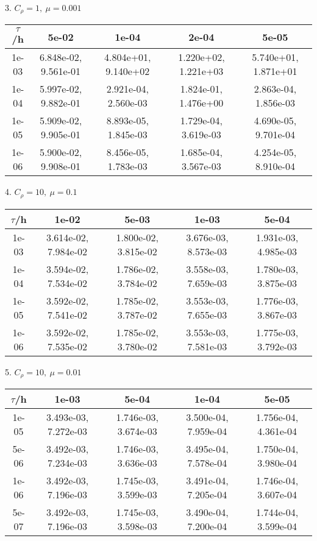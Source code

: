 3. $C_{\rho} = 1, \ \mu = 0.001$
\begin{center}
	\begin{tabular}{|c|c|c|c|c|} 
		\hline
		$\tau$/h & 5e-02 & 1e-04 & 2e-04 & 5e-05 \\ 
		\hline
		1e-03 & 6.848e-02,  9.561e-01 & 4.804e+01,  9.140e+02 & 1.220e+02,  1.221e+03 & 5.740e+01,  1.871e+01\\ 
		\hline
		1e-04 & 5.997e-02,  9.882e-01 & 2.921e-04,  2.560e-03 & 1.824e-01,  1.476e+00 & 2.863e-04,  1.856e-03\\ 
		\hline
		1e-05 & 5.909e-02,  9.905e-01 & 8.893e-05,  1.845e-03 & 1.729e-04,  3.619e-03 & 4.690e-05,  9.701e-04\\ 
		\hline
		1e-06 & 5.900e-02,  9.908e-01 & 8.456e-05,  1.783e-03 & 1.685e-04,  3.567e-03 & 4.254e-05,  8.910e-04\\ 
		\hline
	\end{tabular}
\end{center}

4. $C_{\rho} = 10, \ \mu = 0.1$
\begin{center}
	\begin{tabular}{|c|c|c|c|c|} 
		\hline
		$\tau$/h & 1e-02 & 5e-03 & 1e-03 & 5e-04 \\ 
		\hline
		1e-03 & 3.614e-02,  7.984e-02 & 1.800e-02,  3.815e-02 & 3.676e-03,  8.573e-03 & 1.931e-03,  4.985e-03\\ 
		\hline
		1e-04 & 3.594e-02,  7.534e-02 & 1.786e-02,  3.784e-02 & 3.558e-03,  7.659e-03 & 1.780e-03,  3.875e-03\\ 
		\hline
		1e-05 & 3.592e-02,  7.541e-02 & 1.785e-02,  3.787e-02 & 3.553e-03,  7.655e-03 & 1.776e-03,  3.867e-03\\ 
		\hline
		1e-06 & 3.592e-02,  7.535e-02 & 1.785e-02,  3.780e-02 & 3.553e-03,  7.581e-03 & 1.775e-03,  3.792e-03\\ 
		\hline
	\end{tabular}
\end{center}

5. $C_{\rho} = 10, \ \mu = 0.01$
\begin{center}
	\begin{tabular}{|c|c|c|c|c|} 
		\hline
		$\tau$/h & 1e-03 & 5e-04 & 1e-04 & 5e-05 \\ 
		\hline
		1e-05 & 3.493e-03,  7.272e-03 & 1.746e-03,  3.674e-03 & 3.500e-04,  7.959e-04 & 1.756e-04,  4.361e-04\\ 
		\hline
		5e-06 & 3.492e-03,  7.234e-03 & 1.746e-03,  3.636e-03 & 3.495e-04,  7.578e-04 & 1.750e-04,  3.980e-04\\ 
		\hline
		1e-06 & 3.492e-03,  7.196e-03 & 1.745e-03,  3.599e-03 & 3.491e-04,  7.205e-04 & 1.746e-04,  3.607e-04\\ 
		\hline
		5e-07 & 3.492e-03,  7.196e-03 & 1.745e-03,  3.598e-03 & 3.490e-04,  7.200e-04 & 1.744e-04, 3.599e-04\\ 
		\hline
	\end{tabular}
\end{center}

